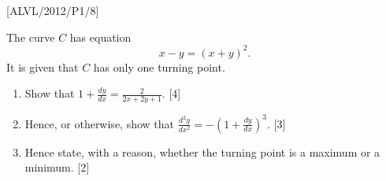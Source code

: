 \item {[}ALVL/2012/P1/8{]}

The curve $C$ has equation 
\[
x-y=\left(x+y\right)^{2}.
\]
It is given that $C$ has only one turning point. 
\begin{enumerate}
\item Show that $1+\frac{dy}{dx}=\frac{2}{2x+2y+1}$. \hfill{}{[}4{]}
\item Hence, or otherwise, show that $\frac{d^{2}y}{dx^{2}}=-\left(1+\frac{dy}{dx}\right)^{3}.$
\hfill{}{[}3{]}
\item Hence state, with a reason, whether the turning point is a maximum
or a minimum. \hfill{}{[}2{]}
\end{enumerate}

